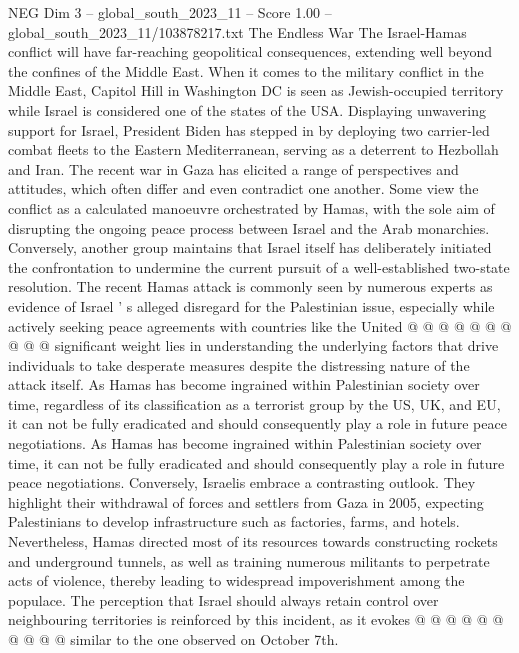\begin{textsample}{NEG Dim 3 – global\_south\_2023\_11 – Score 1.00 – global\_south\_2023\_11/103878217.txt}  \label{ex:f3_neg_085}
The Endless War The Israel-Hamas conflict will have far-reaching geopolitical consequences, extending well beyond the confines of the Middle East.
When it comes to the military conflict in the Middle East, Capitol Hill in Washington DC is seen as Jewish-occupied territory while Israel is considered one of the states of the USA.
Displaying unwavering support for Israel, President Biden has stepped in by deploying two carrier-led combat fleets to the Eastern Mediterranean, serving as a deterrent to Hezbollah and Iran.
The recent war in Gaza has elicited a range of perspectives and attitudes, which often differ and even contradict one another.
Some view the conflict as a calculated manoeuvre orchestrated by Hamas, with the sole aim of disrupting the ongoing peace process between Israel and the Arab monarchies.
Conversely, another group maintains that Israel itself has deliberately initiated the confrontation to undermine the current pursuit of a well-established two-state resolution.
The recent Hamas attack is commonly seen by numerous experts as evidence of Israel ' s alleged disregard for the Palestinian issue, especially while actively seeking peace agreements with countries like the United @ @ @ @ @ @ @ @ @ @ significant weight lies in understanding the underlying factors that drive individuals to take desperate measures despite the distressing nature of the attack itself.
As Hamas has become ingrained within Palestinian society over time, regardless of its classification as a terrorist group by the US, UK, and EU, it can not be fully eradicated and should consequently play a role in future peace negotiations.
As Hamas has become ingrained within Palestinian society over time, it can not be fully eradicated and should consequently play a role in future peace negotiations.
Conversely, Israelis embrace a contrasting outlook.
They highlight their withdrawal of forces and settlers from Gaza in 2005, expecting Palestinians to develop infrastructure such as factories, farms, and hotels.
Nevertheless, Hamas directed most of its resources towards constructing rockets and underground tunnels, as well as training numerous militants to perpetrate acts of violence, thereby leading to widespread impoverishment among the populace.
The perception that Israel should always retain control over neighbouring territories is reinforced by this incident, as it evokes @ @ @ @ @ @ @ @ @ @ similar to the one observed on October 7th.

\end{textsample}
